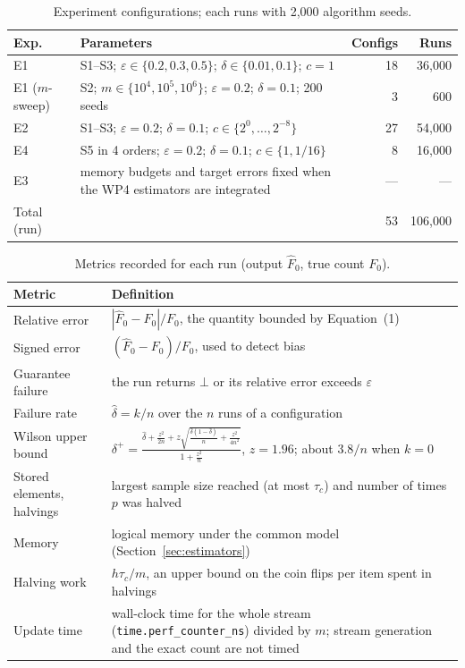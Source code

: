 \documentclass[11pt]{article}
\newcommand{\eps}{\varepsilon}
\newcommand{\Fhat}{\widehat{F}_0}
\newcommand{\dhat}{\widehat{\delta}}
\begin{document}
\begin{table}[htbp]
\centering\small
\caption{Experiment configurations; each runs with 2,000 algorithm
seeds.}\label{tab:configs}
\begin{tabularx}{\linewidth}{@{}lLrr@{}}
\toprule
Exp. & Parameters & Configs & Runs \\
\midrule
E1 & S1--S3; $\eps \in \{0.2, 0.3, 0.5\}$; $\delta \in \{0.01, 0.1\}$;
  $c = 1$ & 18 & 36,000 \\
E1 ($m$-sweep) & S2; $m \in \{10^4, 10^5, 10^6\}$; $\eps = 0.2$;
  $\delta = 0.1$; 200 seeds & 3 & 600 \\
E2 & S1--S3; $\eps = 0.2$; $\delta = 0.1$; $c \in \{2^0, \dots, 2^{-8}\}$ &
  27 & 54,000 \\
E4 & S5 in 4 orders; $\eps = 0.2$; $\delta = 0.1$; $c \in \{1, 1/16\}$ &
  8 & 16,000 \\
E3 & memory budgets and target errors fixed when the WP4 estimators are
  integrated & --- & --- \\
\midrule
Total (run) & & 53 & 106,000 \\
\bottomrule
\end{tabularx}
\end{table}

\begin{table}[htbp]
\centering\small
\caption{Metrics recorded for each run (output $\Fhat$, true count
$F_0$).}\label{tab:metrics}
\begin{tabularx}{\linewidth}{@{}p{3.4cm}L@{}}
\toprule
Metric & Definition \\
\midrule
Relative error & $|\Fhat - F_0|/F_0$, the quantity bounded by Equation~(1) \\
Signed error & $(\Fhat - F_0)/F_0$, used to detect bias \\
Guarantee failure & the run returns $\bot$ or its relative error exceeds
  $\eps$ \\
Failure rate & $\dhat = k/n$ over the $n$ runs of a configuration \\
Wilson upper bound &
  $\displaystyle \delta^+ = \frac{\dhat + \frac{z^2}{2n}
  + z\sqrt{\frac{\dhat(1-\dhat)}{n} + \frac{z^2}{4n^2}}}{1 + \frac{z^2}{n}}$,
  $z = 1.96$; about $3.8/n$ when $k = 0$ \\
Stored elements, halvings & largest sample size reached (at most $\tau_c$)
  and number of times $p$ was halved \\
Memory & logical memory under the common model (Section~\ref{sec:estimators}) \\
Halving work & $h\tau_c/m$, an upper bound on the coin flips per item spent
  in halvings \\
Update time & wall-clock time for the whole stream
  (\texttt{time.perf\_counter\_ns}) divided by $m$; stream generation and the
  exact count are not timed \\
\bottomrule
\end{tabularx}
\end{table}
\end{document}
